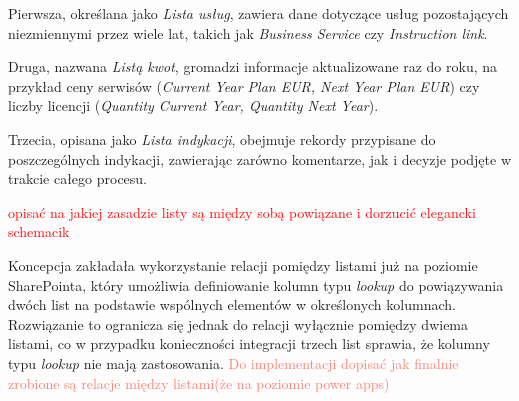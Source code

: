 Pierwsza, określana jako \emph{Lista usług}, zawiera dane dotyczące usług pozostających niezmiennymi przez wiele lat, takich jak \emph{Business Service} czy \emph{Instruction link}.

Druga, nazwana \emph{Listą kwot}, gromadzi informacje aktualizowane raz do roku, na przykład ceny serwisów (\emph{Current Year Plan EUR, Next Year Plan EUR}) czy liczby licencji (\emph{Quantity Current Year, Quantity Next Year}).

Trzecia, opisana jako \emph{Lista indykacji}, obejmuje rekordy przypisane do poszczególnych indykacji, zawierając zarówno komentarze, jak i decyzje podjęte w trakcie całego procesu.
\vspace{2cm}\par
\textcolor{red}{opisać na jakiej zasadzie listy są między sobą powiązane i dorzucić elegancki schemacik}
\vspace{2cm}\par
Koncepcja zakładała wykorzystanie relacji pomiędzy listami już na poziomie SharePointa, który umożliwia definiowanie kolumn typu \emph{lookup} do powiązywania dwóch list na podstawie wspólnych elementów w określonych kolumnach. Rozwiązanie to ogranicza się jednak do relacji wyłącznie pomiędzy dwiema listami, co w przypadku konieczności integracji trzech list sprawia, że kolumny typu \emph{lookup} nie mają zastosowania.
\newline
\textcolor{Salmon}{Do implementacji dopisać jak finalnie zrobione są relacje między listami(że na poziomie power apps)}






